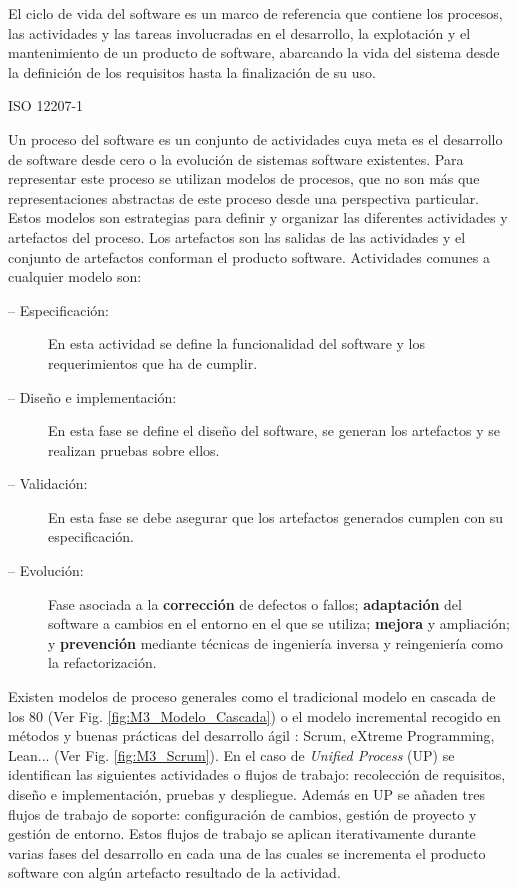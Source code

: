 \epigraph{El ciclo de vida del software es un marco de referencia que contiene los procesos, las actividades y las tareas involucradas en el desarrollo, la explotación y el mantenimiento de un producto de software, abarcando la vida del sistema desde la definición de los requisitos hasta la finalización de su uso.}{ISO 12207-1}

Un proceso del software es un conjunto de actividades cuya meta es el desarrollo de software desde cero o la evolución de sistemas software existentes. Para representar este proceso se utilizan modelos de procesos, que no son más que representaciones abstractas de este proceso desde una perspectiva particular. Estos modelos son estrategias para definir y organizar las diferentes actividades y artefactos del proceso. Los artefactos son las salidas de las actividades y el conjunto de artefactos conforman el producto software. Actividades comunes a cualquier modelo son:
\begin{description}
	\item[-- Especificación:] En esta actividad se define la funcionalidad del software y los requerimientos que ha de cumplir.
	\item[-- Diseño e implementación:] En esta fase se define el diseño del software, se generan los artefactos y se realizan pruebas sobre ellos.
	\item[-- Validación:] En esta fase se debe asegurar que los artefactos generados cumplen con su especificación.
	\item[-- Evolución:] Fase asociada a la \textbf{corrección} de defectos o fallos; \textbf{adaptación} del software a cambios en el entorno en el que se utiliza; \textbf{mejora} y ampliación; y \textbf{prevención} mediante técnicas de ingeniería inversa y reingeniería como la refactorización.
\end{description}

Existen modelos de proceso generales como el tradicional modelo en cascada de los 80 (Ver Fig. \ref{fig:M3_Modelo_Cascada}) o el modelo incremental recogido en métodos y buenas prácticas del desarrollo ágil \citep{noauthor_scrum_2019}: Scrum, eXtreme Programming, Lean... (Ver Fig. \ref{fig:M3_Scrum}). En el caso de  \textit{Unified Process} (UP) \citep{jacobson_proceso_2000} se identifican las siguientes actividades o flujos de trabajo: recolección de requisitos, diseño e implementación, pruebas y despliegue. Además en UP se añaden tres flujos de trabajo de soporte: configuración de cambios, gestión de proyecto y gestión de entorno. Estos flujos de trabajo se aplican iterativamente durante varias fases del desarrollo en cada una de las cuales se incrementa el producto software con algún artefacto resultado de la actividad.


